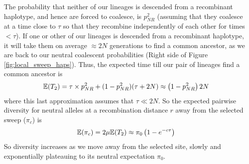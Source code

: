 The probability that neither of our lineages is descended from a
recombinant haplotype, and hence are forced to coalesce, is $p_{NR}^2$ (assuming that
they coalesce at a time close to $\tau$ so that they recombine
independently of each other for times $< \tau$).
If one or other of our lineages is descended from a recombinant haplotype, it will take them on average
$\approx 2N$ generations to find a common ancestor, as we are back to our
neutral coalescent probabilities (Right side of Figure \ref{fig:local_sweep_haps}). Thus, the expected time
till our pair of lineages find a common ancestor is
\begin{equation}
\mathbb{E}(T_2)  = \tau \times p_{NR}^2 +(1-p_{NR}^2) (\tau +2N) \approx
\left(1-p_{NR}^2 \right) 2N
\end{equation}
where this last approximation assumes that $\tau \ll 2N$. So the
expected pairwise diversity for neutral alleles at a recombination
distance $r$ away from the selected sweep ($\pi_c$) is
\begin{equation}
\mathbb{E}(\pi_c) = 2\mu \mathbb{E}(T_2)  \approx \pi_0 \left(1-e^{-c\tau} \right) \label{eqn:pi_HH}
\end{equation}
So diversity increases as we move away from the selected site,
slowly and exponentially plateauing to its neutral expectation
$\pi_0$.\\
